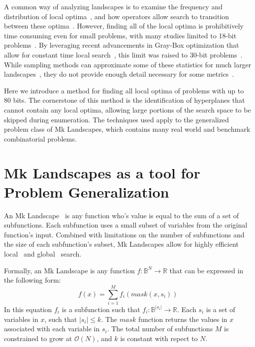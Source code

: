 \documentclass[runningheads,a4paper]{llncs}
\newcommand{\BigO}[1]{$\mathcal{O}{(#1)}$}
\begin{document}
A common way of analyzing landscapes is to
examine the frequency and distribution of local optima~\cite{boese:1994:bigvalley},
and how operators allow search to transition between these
optima~\cite{tomassini:2008:nknetworks,verel:2011:nknetworks,ochoa:2015:crossovernetworks}.
However, finding all of the local optima is prohibitively time consuming
even for small problems, with many studies limited to 18-bit
problems~\cite{tomassini:2008:nknetworks,verel:2011:nknetworks}.
By leveraging recent advancements in Gray-Box optimization that allow for
constant time local search~\cite{chicano:2014:ball}, this limit was raised
to 30-bit problems~\cite{ochoa:2015:crossovernetworks}. While sampling
methods can approximate some of these statistics for much larger
landscapes~\cite{iclanzan:2014:somnetworks}, they do not provide enough
detail necessary for some metrics~\cite{ochoa:2015:crossovernetworks}.

Here we introduce a method for finding all local optima of problems
with up to 80 bits. The cornerstone of this method is the identification
of hyperplanes that cannot contain any local optima, allowing large
portions of the search space to be skipped during enumeration.
The techniques used apply to the generalized problem class of Mk Landscapes,
which contains many real world and benchmark combinatorial problems.



\section{Mk Landscapes as a tool for Problem Generalization}
An Mk Landscape~\cite{whitley:2015:mk} is any function
who's value is equal to the sum of a set of subfunctions.
Each subfunction uses a small subset of variables from the original function's input.
Combined with limitations on the number of subfunctions and the size of each subfunction's
subset, Mk Landscapes allow for highly efficient local~\cite{whitley:2012:constant,chicano:2014:ball}
and global~\cite{goldman:2015:GBO,tintos:2015:partitioncross} search.

Formally, an Mk Landscape is any function $f : \mathbb{B}^{N}\rightarrow \mathbb{R}$
that can be expressed in the following form:
\begin{equation}
  f(x) = \sum_{i=1}^{M} f_i(mask(x, s_i))
  \label{eq-mk}
\end{equation}
In this equation $f_i$ is a subfunction such that $f_i : \mathbb{B}^{|s_i|}\rightarrow \mathbb{R}$.
Each $s_i$ is a set of variables in $x$, such that $|s_i| \leq k$.
The $mask$ function
returns the values in $x$ associated with each variable in $s_i$.
The total number of subfunctions $M$ is constrained to grow at \BigO{N}, and $k$
is constant with repect to $N$.
\end{document}
